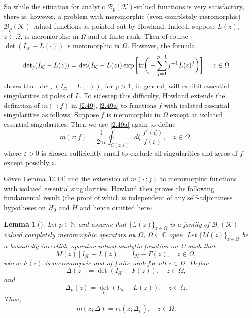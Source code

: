 \documentclass[reqno,10pt, centertags]{amsart}
\newcommand{\bbN}{{\mathbb{N}}}
\newcommand{\bbC}{{\mathbb{C}}}
\newcommand{\cB}{{\mathcal B}}
\newcommand{\cK}{{\mathcal K}}
\newcommand{\lb}{\label}
\newcommand{\f}{\frac}
\newcommand{\tr}{\text{\rm{tr}}}
\numberwithin{equation}{section}
\newtheorem{lemma}[theorem]{Lemma}
\theoremstyle{definition}
\begin{document}
So while the situation for analytic $\cB_p(\cK)$-valued functions
is very satisfactory, there is, however, a problem with
meromorphic (even completely meromorphic) $\cB_p(\cK)$-valued
functions as pointed out by Howland. Indeed, suppose $L(z)$,
$z\in\Omega$, is meromorphic in $\Omega$ and of finite rank. Then
of course $\det(I_{\cK}-L(\cdot))$ is meromorphic in $\Omega$.
However, the formula
\begin{equation}
{\det}_p(I_{\cK}-L(z))=\det(I_{\cK}-L(z))
\exp\bigg[\tr\bigg(-\sum_{j=1}^{p-1}j^{-1} L(z)^j\bigg)\bigg],
\quad z\in\Omega \lb{2.80}
\end{equation}
shows that ${\det}_p(I_{\cK}-L(\cdot))$, for $p>1$, in general,
will exhibit essential singularities at poles of $L$. To sidestep
this difficulty, Howland extends the definition of $m(\cdot\,;f)$ in
\eqref{2.49}, \eqref{2.49a} to functions $f$ with isolated
essential singularities as follows: Suppose $f$ is meromorphic in
$\Omega$ except at isolated essential singularities. Then we use
\eqref{2.49a} again to define
\begin{equation}
m(z;f)=\f{1}{2\pi i} \oint_{C(z; \varepsilon) } d\zeta \,
\f{f'(\zeta)}{f(\zeta)}, \quad z\in\Omega, \lb{2.81}
\end{equation}
where $\varepsilon>0$ is chosen sufficiently small to exclude all
singularities and zeros of $f$ except possibly $z$.

Given Lemma \ref{l2.14} and the extension of $m(\cdot\,;f)$ to
meromorphic functions with isolated essential singularities, Howland
\cite{Ho70} then proves the following fundamental result (the proof
of which is independent of any self-adjointness hypotheses on $H_0$
and $H$ and hence omitted here).

\begin{lemma} [\cite{Ho70}] \lb{l2.15}
Let $p\in\bbN$ and assume that $\{L(z)\}_{z\in\Omega}$ is a family of
$\cB_p(\cK)$-valued completely meromorphic operators on $\Omega$,
$\Omega\subseteq\bbC$ open. Let $\{M(z)\}_{z\in\Omega}$ be a boundedly
invertible operator-valued analytic function on $\Omega$ such that
\begin{equation}
M(z)[I_{\cK}-L(z)]=I_{\cK}-F(z), \quad z\in\Omega, \lb{2.82}
\end{equation}
where $F(z)$ is meromorphic and of finite rank for all $z\in\Omega$.
Define
\begin{equation}
\Delta(z)=\det(I_{\cK}-F(z)), \quad z\in\Omega, \lb{2.83}
\end{equation}
and
\begin{equation}
\Delta_p(z)={\det}_p(I_{\cK}-L(z)), \quad z\in\Omega.  \lb{2.84}
\end{equation}
Then,
\begin{equation}
m(z;\Delta)=m(z;\Delta_p), \quad z\in\Omega. \lb{2.85}
\end{equation}
\end{lemma}
\end{document}
